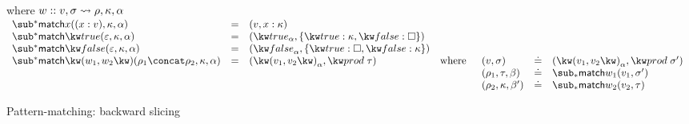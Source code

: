\begin{figure}[H]
\flushleft {}
 where $w :: v, \sigma \rightsquigarrow \rho, \kappa, \alpha$ \\
 \small
\vspace{3mm}
$\begin{array}{lllll}
   \matchBwdF{\matchVarNew{x}}(\bind{x}{v}, \kappa, \alpha)
   &=&
   (v, \elimVar{x}{\kappa})
   \\
   \matchBwdF{\matchTrueNew}(\seqEmpty, \kappa, \alpha)
   &=&
   (\annTrue{\alpha}, \elimBool{\kappa}{\hole})
   \\
   \matchBwdF{\matchFalseNew}(\seqEmpty, \kappa, \alpha)
   &=&
   (\annFalse{\alpha}, \elimBool{\hole}{\kappa})
   \\
   \matchBwdF{\matchPair{w_1}{w_2}}(\rho_1 \concat \rho_2, \kappa, \alpha)
   &=&
   (\annPair{v_1}{v_2}{\alpha}, \elimProd{\tau})
   &\text{where}&
   \begin{array}[t]{lll}
      (v, \sigma) &\eq& (\annPair{v_1}{v_2}{\alpha}, \elimProd{\sigma'})
      \\
      (\rho_1, \tau, \beta) &\eq& \matchFwdF{w_1}(v_1,\sigma')
      \\
      (\rho_2, \kappa, \beta') &\eq& \matchFwdF{w_2}(v_2,\tau)
   \end{array}
\end{array}$

\vspace{5mm}
\flushleft {}
\caption{Pattern-matching: backward slicing}
\end{figure}

